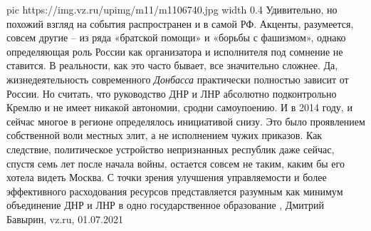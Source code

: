 \ifcmt
  pic https://img.vz.ru/upimg/m11/m1106740.jpg
  width 0.4
\fi
Удивительно, но похожий взгляд на события распространен и в самой РФ. Акценты,
разумеется, совсем другие – из ряда «братской помощи» и «борьбы с фашизмом»,
однако определяющая роль России как организатора и исполнителя под сомнение не
ставится.  В реальности, как это часто бывает, все значительно сложнее. Да,
жизнедеятельность современного \emph{Донбасса} практически полностью зависит от
России. Но считать, что руководство ДНР и ЛНР абсолютно подконтрольно Кремлю и
не имеет никакой автономии, сродни самоупоению.  И в 2014 году, и сейчас многое
в регионе определялось инициативой снизу. Это было проявлением собственной воли
местных элит, а не исполнением чужих приказов.  Как следствие, политическое
устройство непризнанных республик даже сейчас, спустя семь лет после начала
войны, остается совсем не таким, каким бы его хотела видеть Москва. С точки
зрения улучшения управляемости и более эффективного расходования ресурсов
представляется разумным как минимум объединение ДНР и ЛНР в одно
государственное образование
, Дмитрий Бавырин, vz.ru, 01.07.2021
